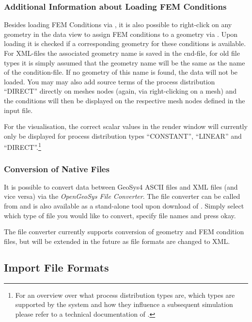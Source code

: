 \subsubsection{Additional Information about Loading FEM Conditions}

Besides loading FEM Conditions via  , it is also possible to right-click on any geometry in the data view to assign FEM conditions to a geometry via . Upon loading it is checked if a corresponding geometry for these conditions is available. For XML-files the associated geometry name is saved in the cnd-file, for old file types it is simply assumed that the geometry name will be the same as the name of the condition-file. If no geometry of this name is found, the data will not be loaded. You may may also add source terms of the process distribution ``DIRECT'' directly on meshes nodes (again, via right-clicking on a mesh) and the conditions will then be displayed on the respective mesh nodes defined in the input file.

For the visualisation, the correct scalar values in the render window will currently only be displayed for process distribution types ``CONSTANT'', ``LINEAR'' and ``DIRECT''.\footnote{For an overview over what process distribution types are, which types are supported by the system and how they influence a subsequent simulation please refer to a technical documentation of \ogs.}

\subsubsection{Conversion of Native Files}

It is possible to convert data between GeoSys4 ASCII files and \ogs XML files (and vice versa) via the \emph{OpenGeoSys File Converter}. The file converter can be called from  and is also available as a stand-alone tool upon download of \ogs. Simply select which type of file you would like to convert, specify file names and press okay.

The file converter currently supports conversion of geometry and FEM condition files, but will be extended in the future as file formats are changed to XML.

\subsection{Import File Formats}
\label{Import File Formats}


